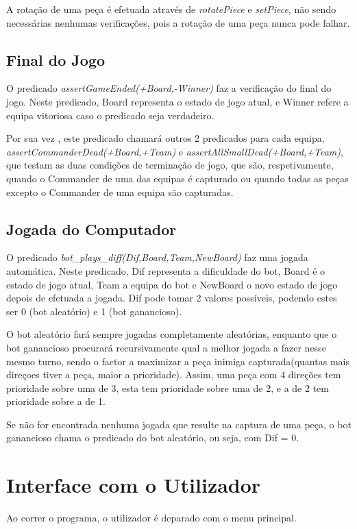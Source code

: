 \documentclass[a4paper]{article}
\begin{document}
A rotação de uma peça é efetuada através de \textit{rotatePiece} e \textit{setPiece}, não sendo necessárias nenhumas verificações, pois a rotação de uma peça nunca pode falhar.

\subsection{Final do Jogo}
O predicado \textit{assertGameEnded(+Board,-Winner)} faz a  verificação do final do jogo.
Neste predicado, Board representa o estado de jogo atual, e Winner refere a equipa vitoriosa caso o predicado seja verdadeiro.

Por sua vez , este predicado chamará outros 2 predicados para cada equipa, \textit{assertCommanderDead(+Board,+Team)} e \textit{assertAllSmallDead(+Board,+Team)}, que testam as duas condições de terminação de jogo, que são, respetivamente, quando o Commander de uma das equipas é capturado ou quando todas as peças excepto o Commander de uma equipa são capturadas.

\subsection{Jogada do Computador}%
O predicado \textit{bot\_plays\_diff(Dif,Board,Team,NewBoard)} faz uma jogada automática.
Neste predicado, Dif representa a dificuldade do bot, Board é o estado de jogo atual, Team a equipa do bot e NewBoard o novo estado de jogo depois de efetuada a jogada. Dif pode tomar 2 valores possíveis, podendo estes ser 0 (bot aleatório) e 1 (bot ganancioso).

O bot aleatório fará sempre jogadas completamente aleatórias, enquanto que o bot ganancioso procurará recursivamente qual a melhor jogada a fazer nesse mesmo turno, sendo o factor a maximizar a peça inimiga capturada(quantas mais direçoes tiver a peça, maior a prioridade). Assim, uma peça com 4 direções tem prioridade sobre uma de 3, esta tem prioridade sobre uma de 2, e a de 2 tem prioridade sobre a de 1.

Se não for encontrada nenhuma jogada que resulte na captura de uma peça, o bot ganancioso chama o predicado do bot aleatório, ou seja, com Dif = 0.

\section{Interface com o Utilizador}
Ao correr o programa, o utilizador é deparado com o menu principal.
\end{document}
